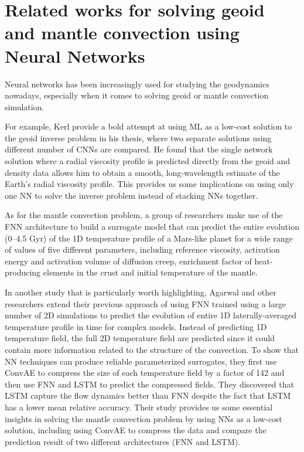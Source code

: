 \section{Related works for solving geoid and mantle convection using Neural Networks}

Neural networks has been increasingly used for studying the geodynamics nowadays, especially when it comes to solving geoid or mantle convection simulation. 

For example, Kerl provide a bold attempt at using ML as a low-cost solution to the geoid inverse problem in his thesis, where two separate solutions using different number of CNNs are compared.\citep{kerl2022geoid} He found that the single network solution where a radial viscosity profile is predicted directly from the geoid and density data allows him to obtain a smooth, long-wavelength estimate of the Earth’s radial viscosity profile. This provides us some implications on using only one NN to solve the inverse problem instead of stacking NNs together.

As for the mantle convection problem, a group of researchers \citep{10.1093_gji_ggaa234} make use of the FNN architecture to build a surrogate model that can predict the entire evolution (0–4.5 Gyr) of the 1D temperature profile of a Mars-like planet for a wide range of values of five different parameters, including reference viscosity, activation energy and activation volume of diffusion creep, enrichment factor of heat-producing elements in the crust and initial temperature of the mantle.

In another study that is particularly worth highlighting, Agarwal and other researchers extend their previous approach \citep{10.1093_gji_ggaa234} of using FNN trained using a large number of 2D simulations to predict the evolution of entire 1D laterally-averaged temperature profile in time for complex models. Instead of predicting 1D temperature field, the full 2D temperature field are predicted since it could contain more information related to the structure of the convection.\citep{10.1103_physrevfluids.6.113801} To show that NN techniques can produce reliable parameterized surrogates, they first use ConvAE to compress the size of each temperature field by a factor of 142 and then use FNN and LSTM to predict the compressed fields. They discovered that LSTM capture the flow dynamics better than FNN despite the fact that LSTM has a lower mean relative accuracy. Their study provides us some essential insights in solving the mantle convection problem by using NNs as a low-cost solution, including using ConvAE to compress the data and compare the prediction result of two different architectures (FNN and LSTM).

